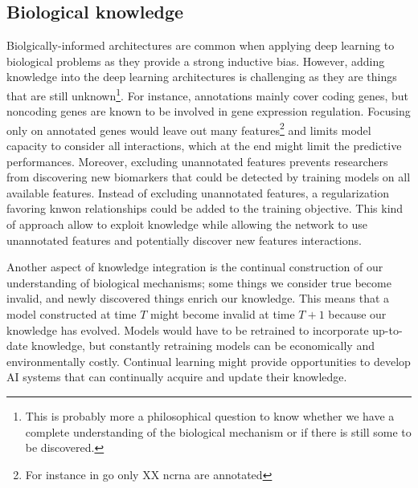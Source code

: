 \documentclass[../main.tex]{subfiles}
\begin{document}
	\subsection{Biological knowledge}\label{sec:persp_knwoledged}
		Biolgically-informed architectures are common when applying deep learning to biological problems as they provide a strong inductive bias.
		However, adding knowledge into the deep learning architectures is challenging as they are things that are still unknown\footnote{This is probably more a philosophical question to know whether we have a complete understanding of the biological mechanism or if there is still some to be discovered.}.
		For instance, annotations mainly cover coding genes, but noncoding genes are known to be involved in gene expression regulation.
		Focusing only on annotated genes would leave out many features\footnote{For instance in \gls{go} only XX \gls{ncrna} are annotated} and limits model capacity to consider all interactions, which at the end might limit the predictive performances.
		Moreover, excluding unannotated features prevents researchers from discovering new biomarkers that could be detected by training models on all available features.
		Instead of excluding unannotated features, a regularization favoring knwon relationships could be added to the training objective.
		This kind of approach allow to exploit knowledge while allowing the network to use unannotated features and potentially discover new features interactions.

		Another aspect of knowledge integration is the continual construction of our understanding of biological mechanisms; some things we consider true become invalid, and newly discovered things enrich our knowledge.
		This means that a model constructed at time \(T\) might become invalid at time \(T+1\) because our knowledge has evolved.
		Models would have to be retrained to incorporate up-to-date knowledge, but constantly retraining models can be economically and environmentally costly.
		Continual learning might provide opportunities to develop AI systems that can continually acquire and update their knowledge\cite{wang2024comprehensivesurveycontinuallearning}.
\end{document}
